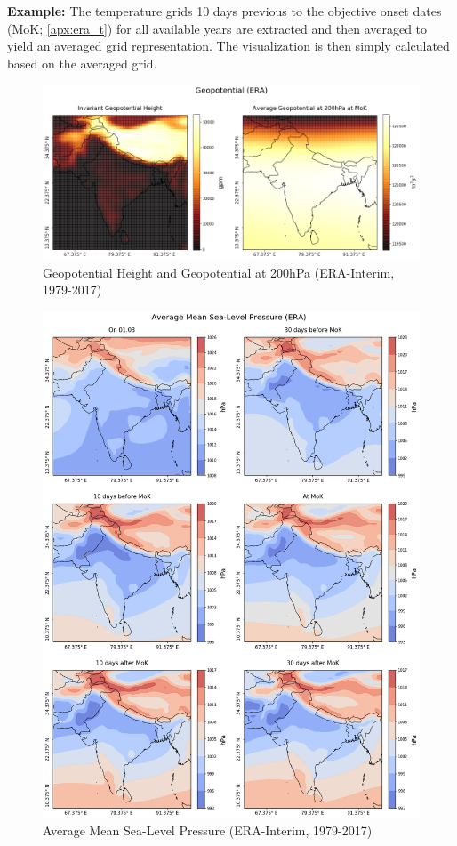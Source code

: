 \textbf{Example:} The temperature grids 10 days previous to the objective onset dates (MoK; \ref{apx:era_t}) for all available years are extracted and then averaged to yield an averaged grid representation. The visualization is then simply calculated based on the averaged grid.

\begin{figure}[h]
  \centering
  \includegraphics[width=\linewidth]{./99_appendix/img/geopotential}
  \caption{Geopotential Height and Geopotential at 200hPa (ERA-Interim, 1979-2017)}
  \label{apx:era_geopotential}
\end{figure}

\begin{figure}[h]
  \centering
  \includegraphics[width=\linewidth]{./99_appendix/img/msl_avg}
  \caption{Average Mean Sea-Level Pressure (ERA-Interim, 1979-2017)}
  \label{apx:era_msl}
\end{figure}

